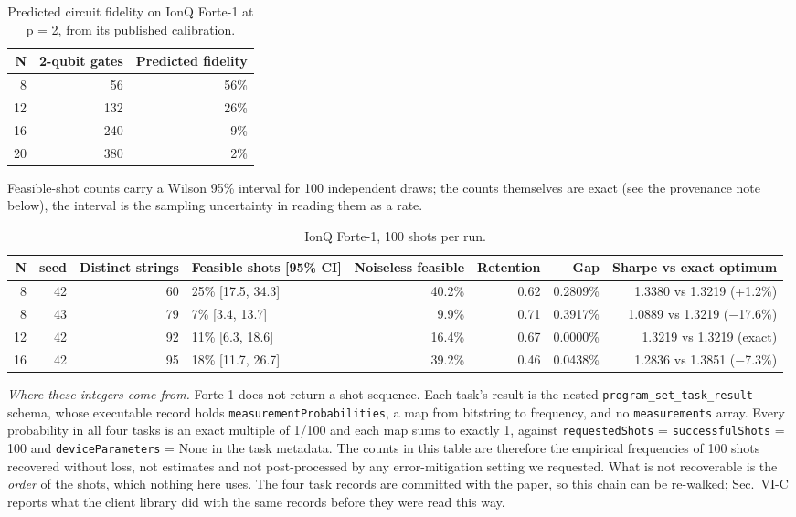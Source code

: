 \documentclass[journal]{IEEEtran}
\begin{document}
\begin{table}[!t]
\centering
\footnotesize
\caption{Predicted circuit fidelity on IonQ Forte-1 at p = 2, from its published calibration.}
\label{tab:S31}
\begin{tabular}{rrr}
\toprule
N & 2-qubit gates & Predicted fidelity \\
\midrule
8 & 56 & 56\% \\
12 & 132 & 26\% \\
16 & 240 & 9\% \\
20 & 380 & 2\% \\
\bottomrule
\end{tabular}
\end{table}


Feasible-shot counts carry a Wilson 95\% interval for 100 independent draws; the counts themselves are exact (see the provenance note below), the interval is the sampling uncertainty in reading them as a rate.


\begin{table}[!t]
\centering
\scriptsize
\caption{IonQ Forte-1, 100 shots per run.}
\label{tab:S32}
\begin{tabular}{rrrlrrrr}
\toprule
N & seed & Distinct strings & Feasible shots [95\% CI] & Noiseless feasible & Retention & Gap & Sharpe vs exact optimum \\
\midrule
8 & 42 & 60 & 25\% [17.5, 34.3] & 40.2\% & 0.62 & 0.2809\% & 1.3380 vs 1.3219 (+1.2\%) \\
8 & 43 & 79 & 7\% [3.4, 13.7] & 9.9\% & 0.71 & 0.3917\% & 1.0889 vs 1.3219 ($-$17.6\%) \\
12 & 42 & 92 & 11\% [6.3, 18.6] & 16.4\% & 0.67 & 0.0000\% & 1.3219 vs 1.3219 (exact) \\
16 & 42 & 95 & 18\% [11.7, 26.7] & 39.2\% & 0.46 & 0.0438\% & 1.2836 vs 1.3851 ($-$7.3\%) \\
\bottomrule
\end{tabular}
\end{table}


\textit{Where these integers come from.} Forte-1 does not return a shot sequence. Each task's result is the nested \texttt{program\_set\_task\_result} schema, whose executable record holds \texttt{measurementProbabilities}, a map from bitstring to frequency, and no \texttt{measurements} array. Every probability in all four tasks is an exact multiple of 1/100 and each map sums to exactly 1, against \texttt{requestedShots} = \texttt{successfulShots} = 100 and \texttt{deviceParameters} = None in the task metadata. The counts in this table are therefore the empirical frequencies of 100 shots recovered without loss, not estimates and not post-processed by any error-mitigation setting we requested. What is not recoverable is the \textit{order} of the shots, which nothing here uses. The four task records are committed with the paper, so this chain can be re-walked; Sec.~VI-C reports what the client library did with the same records before they were read this way.
\end{document}
